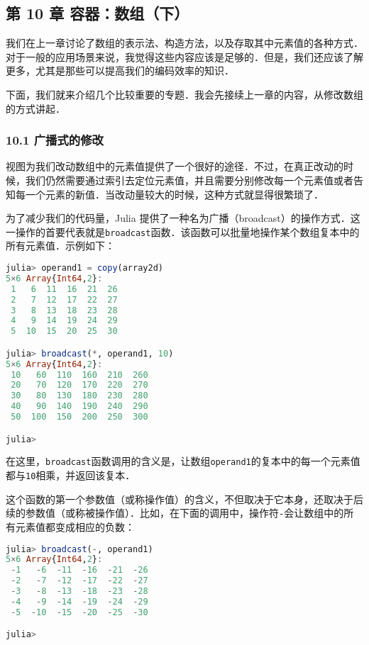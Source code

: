 
\subsection{第 10 章 容器：数组（下）}

我们在上一章讨论了数组的表示法、构造方法，以及存取其中元素值的各种方式．对于一般的应用场景来说，我觉得这些内容应该是足够的．但是，我们还应该了解更多，尤其是那些可以提高我们的编码效率的知识．

下面，我们就来介绍几个比较重要的专题．我会先接续上一章的内容，从修改数组的方式讲起．

\subsubsection{10.1 广播式的修改}

视图为我们改动数组中的元素值提供了一个很好的途径．不过，在真正改动的时候，我们仍然需要通过索引去定位元素值，并且需要分别修改每一个元素值或者告知每一个元素的新值．当改动量较大的时候，这种方式就显得很繁琐了．

为了减少我们的代码量，Julia 提供了一种名为广播（broadcast）的操作方式．这一操作的首要代表就是\verb|broadcast|函数．该函数可以批量地操作某个数组复本中的所有元素值．示例如下：

\begin{lstlisting}[language=julia]
julia> operand1 = copy(array2d)
5×6 Array{Int64,2}:
 1   6  11  16  21  26
 2   7  12  17  22  27
 3   8  13  18  23  28
 4   9  14  19  24  29
 5  10  15  20  25  30

julia> broadcast(*, operand1, 10)
5×6 Array{Int64,2}:
 10   60  110  160  210  260
 20   70  120  170  220  270
 30   80  130  180  230  280
 40   90  140  190  240  290
 50  100  150  200  250  300

julia> 
\end{lstlisting}

在这里，\verb|broadcast|函数调用的含义是，让数组\verb|operand1|的复本中的每一个元素值都与\verb|10|相乘，并返回该复本．

这个函数的第一个参数值（或称操作值）的含义，不但取决于它本身，还取决于后续的参数值（或称被操作值）．比如，在下面的调用中，操作符\verb|-|会让数组中的所有元素值都变成相应的负数：

\begin{lstlisting}[language=julia]
julia> broadcast(-, operand1)
5×6 Array{Int64,2}:
 -1   -6  -11  -16  -21  -26
 -2   -7  -12  -17  -22  -27
 -3   -8  -13  -18  -23  -28
 -4   -9  -14  -19  -24  -29
 -5  -10  -15  -20  -25  -30

julia> 
\end{lstlisting}

